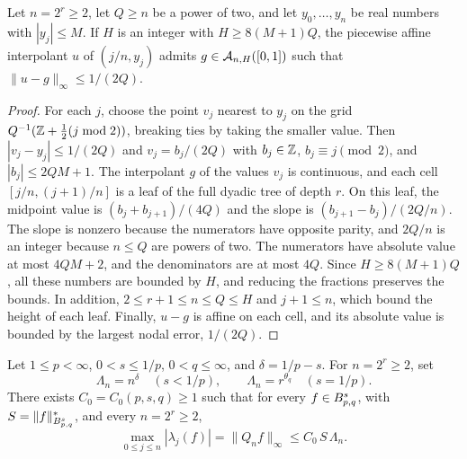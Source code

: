 \documentclass[11pt,a4paper]{article}
\begin{document}
\begin{lema}
\label{lp:lem:nodal-general}
Let $n=2^r\ge2$, let $Q\ge n$ be a power of two, and let $y_0,\ldots,y_n$ be real numbers with $|y_j|\le M$. If $H$ is an integer with $H\ge8(M+1)Q$, the piecewise affine interpolant $u$ of $(j/n,y_j)$ admits $g\in\mathcal A_{n,H}([0,1])$ such that $\|u-g\|_\infty\le1/(2Q)$.
\end{lema}

\begin{proof}
For each $j$, choose the point $v_j$ nearest to $y_j$ on the grid $Q^{-1}(\mathbb Z+\tfrac12(j\bmod2))$, breaking ties by taking the smaller value. Then $|v_j-y_j|\le1/(2Q)$ and $v_j=b_j/(2Q)$ with $b_j\in\mathbb Z$, $b_j\equiv j\pmod2$, and $|b_j|\le2QM+1$. The interpolant $g$ of the values $v_j$ is continuous, and each cell $[j/n,(j+1)/n]$ is a leaf of the full dyadic tree of depth $r$. On this leaf, the midpoint value is $(b_j+b_{j+1})/(4Q)$ and the slope is $(b_{j+1}-b_j)/(2Q/n)$. The slope is nonzero because the numerators have opposite parity, and $2Q/n$ is an integer because $n\le Q$ are powers of two. The numerators have absolute value at most $4QM+2$, and the denominators are at most $4Q$. Since $H\ge8(M+1)Q$, all these numbers are bounded by $H$, and reducing the fractions preserves the bounds. In addition, $2\le r+1\le n\le Q\le H$ and $j+1\le n$, which bound the height of each leaf. Finally, $u-g$ is affine on each cell, and its absolute value is bounded by the largest nodal error, $1/(2Q)$.
\end{proof}

\begin{lema}
\label{lp:lem:sup-bound}
Let $1\le p<\infty$, $0<s\le1/p$, $0<q\le\infty$, and $\delta=1/p-s$. For $n=2^r\ge2$, set
\[
 \Lambda_n=n^{\delta}\quad(s<1/p),\qquad \Lambda_n=r^{\theta_q}\quad(s=1/p).
\]
There exists $C_0=C_0(p,s,q)\ge1$ such that for every $f\in B^{s}_{p,q}$, with $S=\|f\|^*_{B^{s}_{p,q}}$, and every $n=2^r\ge2$,
\[
 \max_{0\le j\le n}|\lambda_j(f)|=\|Q_nf\|_\infty\le C_0\,S\,\Lambda_n .
\]
\end{lema}
\end{document}
